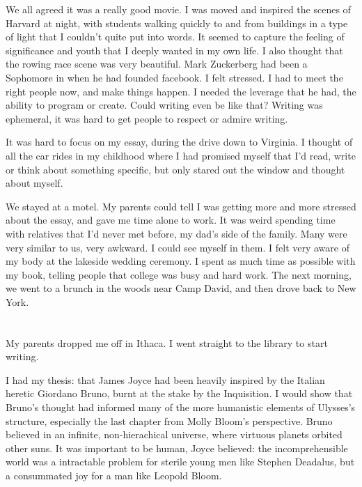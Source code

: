 We all agreed it was a really good movie.  I was moved and inspired the scenes
of Harvard at night, with students walking quickly to and from buildings in a
type of light that I couldn't quite put into words.  It seemed to capture the
feeling of significance and youth that I deeply wanted in my own life.  I also
thought that the rowing race scene was very beautiful.  Mark Zuckerberg had been
a Sophomore in when he had founded facebook.  I felt stressed.  I had to meet
the right people now, and make things happen. I needed the leverage that he had,
the ability to program or create.  Could writing even be like that?  Writing was
ephemeral, it was hard to get people to respect or admire writing.

It was hard to focus on my essay, during the drive down to Virginia.  I thought
of all the car rides in my childhood where I had promised myself that I'd read,
write or think about something specific, but only stared out the window and
thought about myself. 


We stayed at a motel.  My parents could tell I was getting more and more
stressed about the essay, and gave me time alone to work.   It was weird
spending time with relatives that I'd never met before, my dad's side of the
family.  Many were very similar to us, very awkward.  I could see myself in
them.  I felt very aware of my body at the lakeside wedding ceremony.  I spent
as much time as possible with my book, telling people that college was busy and
hard work.  The next morning, we went to a brunch in the woods near Camp David,
and then drove back to New York.

\section{}

My parents dropped me off in Ithaca.  I went straight to the library to start
writing.

I had my thesis: that James Joyce had been heavily inspired by the Italian
heretic Giordano Bruno, burnt at the stake by the Inquisition.  I would show
that Bruno's thought had informed many of the more humanistic elements of
Ulysses's structure, especially the last chapter from Molly Bloom's perspective.
Bruno believed in an infinite, non-hierachical universe, where virtuous planets
orbited other suns.  It was important to be human, Joyce believed: the
incomprehensible world was a intractable problem for sterile young men like
Stephen Deadalus, but a consummated joy for a man like Leopold Bloom.  


